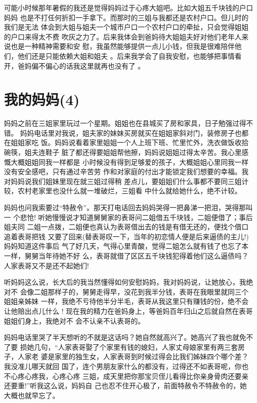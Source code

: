 \documentclass[12pt]{book}
\begin{document}
可能小时候那年暑假的我还是觉得妈妈过于心疼大姐吧。比如大姐五千块钱的户口妈妈
也是不打任何折扣一手拿下。而那时的三姐与我都还是农村户口。但儿时的我们是无法
体会到大姐与姐夫一个城市户口一个农村户口的牵扯，只会觉得姐姐的户口来得太不费
吹灰之力了。后来我体会到爸妈待大姐姐夫好对他们老年人来说也是一种精神需要和安
慰，我虽然能够提供一点儿小钱，但我是很难陪伴他们，他们还是只能依赖大姐和姐夫
。后来我学会了自我安慰，也能够把事情看开，爸妈偏不偏心的话我这里就再也没有了
。
\section{我的妈妈(4)}
\label{sec-9-55}

妈妈之前在三姐家里玩过一个星期。姐姐也在县城买了房和家具，日子勉强过得不错。
妈妈电话里对我说，姐夫家的妹妹买房就买在姐姐家斜对门，装修房子也都在姐姐家吃
饭。妈妈说看着家里姐姐一个人上班下班、忙里忙外，洗衣做饭收拾碗筷，姐夫连鞋子
脏了都还得要姐姐帮他擦，妈妈说姐姐过得太辛苦。我心里感慨大概姐姐同我一样都是
小时候没有得到足够爱的孩子，大概姐姐心里同我一样没有安全感吧，只有通过辛苦劳
作和对家庭的付出才能锁定我们想要的幸福。我对妈妈说我们姐妹里现在就三姐过得稍
差点儿，要姐姐们什么事都不要同三姐计较，农村老家里也没什么就一堆破烂，三姐看
中什么就给她什么，绝不计较。

妈妈也问我索要过“特赦令”。那天打电话回去妈妈哭得一把鼻涕一把泪，哭得那叫一
个悲怆! 听她慢慢说才知道舅舅家的表哥问二姐借五千块钱，二姐便借了；事后姐夫同
二姐一点拨，二姐便也真认为表哥借出去的钱是有借无还的，便找个借口追着表哥把钱
又要了回来(替表哥叹一下，当年的初恋情人便是后来逼债的主儿!) 妈妈知道这件事后
气了好几天，气得心里青酸，觉得二姐怎么就有钱了也忘了本一样，舅舅当年待她不好
么，表哥就借了区区五千块钱犯得着他们这么逼债吗？人家表哥又不是还不起她们! 

听妈妈这么说，长大后的我当然懂得如何安慰妈妈，我对妈妈说，让她放心，我绝对不
会像二姐那样子的，舅舅走得早，没花到我半分钱，表哥在我眼里就同三个姐姐亲姊妹
一样，我绝不亏待他半分半毛，表哥从我这里只有赚钱的份，绝不会让他赔出点儿什么
! 现在我的精力在爸妈身上，等爸妈百年归山之后就自然在表哥姐姐们身上，我绝对不
会不认亲不认表哥的。

妈妈电话里哭了半天想听的不就是这话吗？她自然就高兴了。她高兴了我也就免不了要
损她几句，“人家表哥娶了个家里有钱的媳妇，人家丈母娘家里有两三套房子，人家老
婆是家里的独生女，人家表哥到时候过得会比我们姊妹四个哪个差？我没准儿哪天就回
国了，连个男朋友家什么的都没有，过得还不如表哥呢，你也不心疼心疼我，心疼心疼
三姐，成天里把你那宝贝侄儿看得比你亲身骨肉还要亲还要重!”听我这么说，妈妈自
己也忍不住开心极了，前面特赦令不特赦令的，她大概也就早忘了。
\end{document}
